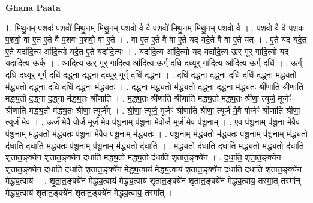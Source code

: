 \documentclass[17pt]{extarticle}
\begin{document}
\textbf{Ghana Paata } \newline

1. मि॒थु॒नम् प॒शवः॑ प॒शवो॑ मिथु॒नम् मि॑थु॒नम् प॒शवो॒ वै वै प॒शवो॑ मिथु॒नम् मि॑थु॒नम् प॒शवो॒ वै । . प॒शवो॒ वै वै प॒शवः॑ प॒शवो॒ वा ए॒त ए॒ते वै प॒शवः॑ प॒शवो॒ वा ए॒ते । . वा ए॒त ए॒ते वै वा ए॒ते यद् यदे॒ते वै वा ए॒ते यत् । . ए॒ते यद् यदे॒त ए॒ते यदा॑दि॒त्य आ॑दि॒त्यो यदे॒त ए॒ते यदा॑दि॒त्यः । . यदा॑दि॒त्य आ॑दि॒त्यो यद् यदा॑दि॒त्य ऊर् गूर् गा॑दि॒त्यो यद् यदा॑दि॒त्य ऊर्क् । . आ॒दि॒त्य ऊर् गूर् गा॑दि॒त्य आ॑दि॒त्य ऊर्ग् दधि॒ दध्यूर् गा॑दि॒त्य आ॑दि॒त्य ऊर्ग् दधि॑ । . ऊर्ग् दधि॒ दध्यूर् गूर्ग् दधि॑ द॒द्ध्ना द॒द्ध्ना दध्यूर् गूर्ग् दधि॑ द॒द्ध्ना । . दधि॑ द॒द्ध्ना द॒द्ध्ना दधि॒ दधि॑ द॒द्ध्ना म॑द्ध्य॒तो म॑द्ध्य॒तो द॒द्ध्ना दधि॒ दधि॑ द॒द्ध्ना म॑द्ध्य॒तः । . द॒द्ध्ना म॑द्ध्य॒तो म॑द्ध्य॒तो द॒द्ध्ना द॒द्ध्ना म॑द्ध्य॒तः श्री॑णाति श्रीणाति मद्ध्य॒तो द॒द्ध्ना द॒द्ध्ना म॑द्ध्य॒तः श्री॑णाति । . म॒द्ध्य॒तः श्री॑णाति श्रीणाति मद्ध्य॒तो म॑द्ध्य॒तः श्री॑णा॒ त्यूर्ज॒ मूर्जꣳ॑ श्रीणाति मद्ध्य॒तो म॑द्ध्य॒तः श्री॑णा॒ त्यूर्ज᳚म् । . श्री॒णा॒ त्यूर्ज॒ मूर्जꣳ॑ श्रीणाति श्रीणा॒ त्यूर्ज॑ मे॒वै वोर्जꣳ॑ श्रीणाति श्रीणा॒ त्यूर्ज॑ मे॒व । . ऊर्ज॑ मे॒वै वोर्ज॒ मूर्ज॑ मे॒व प॑शू॒नाम् प॑शू॒ना मे॒वोर्ज॒ मूर्ज॑ मे॒व प॑शू॒नाम् । . ए॒व प॑शू॒नाम् प॑शू॒ना मे॒वैव प॑शू॒नाम् म॑द्ध्य॒तो म॑द्ध्य॒तः प॑शू॒ना मे॒वैव प॑शू॒नाम् म॑द्ध्य॒तः । . प॒शू॒नाम् म॑द्ध्य॒तो म॑द्ध्य॒तः प॑शू॒नाम् प॑शू॒नाम् म॑द्ध्य॒तो द॑धाति दधाति मद्ध्य॒तः प॑शू॒नाम् प॑शू॒नाम् म॑द्ध्य॒तो द॑धाति । . म॒द्ध्य॒तो द॑धाति दधाति मद्ध्य॒तो म॑द्ध्य॒तो द॑धाति शृतात॒ङ्क्ये॑न शृतात॒ङ्क्ये॑न दधाति मद्ध्य॒तो म॑द्ध्य॒तो द॑धाति शृतात॒ङ्क्ये॑न । . द॒धा॒ति॒ शृ॒ता॒त॒ङ्क्ये॑न शृतात॒ङ्क्ये॑न दधाति दधाति शृतात॒ङ्क्ये॑न मेद्ध्य॒त्वाय॑ मेद्ध्य॒त्वाय॑ शृतात॒ङ्क्ये॑न दधाति दधाति शृतात॒ङ्क्ये॑न मेद्ध्य॒त्वाय॑ । . शृ॒ता॒त॒ङ्क्ये॑न मेद्ध्य॒त्वाय॑ मेद्ध्य॒त्वाय॑ शृतात॒ङ्क्ये॑न शृतात॒ङ्क्ये॑न मेद्ध्य॒त्वाय॒ तस्मा॒त् तस्मा᳚न् मेद्ध्य॒त्वाय॑ शृतात॒ङ्क्ये॑न शृतात॒ङ्क्ये॑न मेद्ध्य॒त्वाय॒ तस्मा᳚त् । \newline
\end{document}

